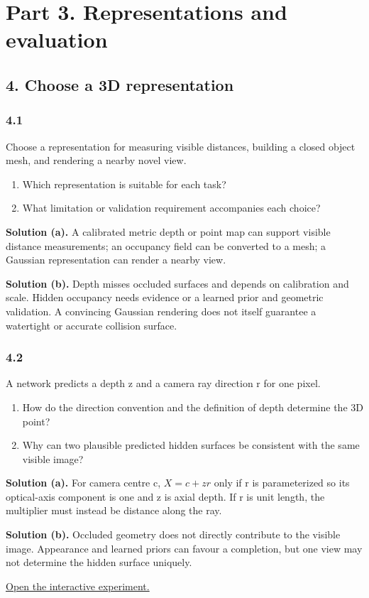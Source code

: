 \documentclass[11pt,a4paper]{article}
\begin{document}
\section*{Part 3. Representations and evaluation}
\subsection*{4. Choose a 3D representation}
\par
\noindent
\begin{minipage}{\linewidth}
\subsubsection*{4.1}
Choose a representation for measuring visible distances, building a closed object mesh, and rendering a nearby novel view.
\begin{enumerate}[label=(\alph*),nosep]
\item Which representation is suitable for each task?
\item What limitation or validation requirement accompanies each choice?
\end{enumerate}
\noindent\textbf{Solution (a).} A calibrated metric depth or point map can support visible distance measurements; an occupancy field can be converted to a mesh; a Gaussian representation can render a nearby view.

\noindent\textbf{Solution (b).} Depth misses occluded surfaces and depends on calibration and scale.
Hidden occupancy needs evidence or a learned prior and geometric validation.
A convincing Gaussian rendering does not itself guarantee a watertight or accurate collision surface.
\end{minipage}
\par\medskip
\par
\noindent
\begin{minipage}{\linewidth}
\subsubsection*{4.2}
A network predicts a depth z and a camera ray direction r for one pixel.
\begin{enumerate}[label=(\alph*),nosep]
\item How do the direction convention and the definition of depth determine the 3D point?
\item Why can two plausible predicted hidden surfaces be consistent with the same visible image?
\end{enumerate}
\noindent\textbf{Solution (a).} For camera centre c, $X=c+zr$ only if r is parameterized so its optical-axis component is one and z is axial depth.
If r is unit length, the multiplier must instead be distance along the ray.

\noindent\textbf{Solution (b).} Occluded geometry does not directly contribute to the visible image.
Appearance and learned priors can favour a completion, but one view may not determine the hidden surface uniquely.
\end{minipage}
\par\medskip
\noindent\href{https://sosekie.github.io/Unibe-CVG-CV-Interactive-Labs/tutorial-10/#representations}{Open the interactive experiment.}
\end{document}
